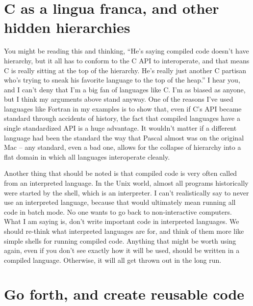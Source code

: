 \documentclass[12pt]{article}
\begin{document}
\section{C as a lingua franca, and other hidden hierarchies}

You might be reading this and thinking, ``He's saying compiled code doesn't
have hierarchy, but it all has to conform to the C API to interoperate, and
that means C is really sitting at the top of the hierarchy. He's really just
another C partisan who's trying to sneak his favorite language to the top of
the heap.'' I hear you, and I can't deny that I'm a big fan of languages like
C. I'm as biased as anyone, but I think my arguments above stand anyway. One of
the reasons I've used languages like Fortran in my examples is to show that,
even if C's API became standard through accidents of history, the fact that
compiled languages have a single standardized API is a huge advantage. It
wouldn't matter if a different language had been the standard the way that
Pascal almost was on the original Mac -- any standard, even a bad one, allows
for the collapse of hierarchy into a flat domain in which all languages
interoperate cleanly.

Another thing that should be noted is that compiled code is very often called
from an interpreted language. In the Unix world, almost all programs
historically were started by the shell, which is an interpreter. I can't
realistically say to never use an interpreted language, because that would
ultimately mean running all code in batch mode. No one wants to go back to
non-interactive computers. What I am saying is, don't write important code in
interpreted languages. We should re-think what interpreted languages are for,
and think of them more like simple shells for running compiled code. Anything
that might be worth using again, even if you don't see exactly how it will be
used, should be written in a compiled language. Otherwise, it will all get
thrown out in the long run.


\section{Go forth, and create reusable code}

\end{document}
